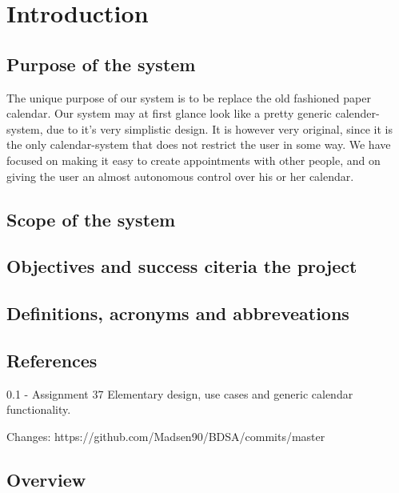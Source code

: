 \section{Introduction}
	\subsection{Purpose of the system}
	The unique purpose of our system is to be replace the old fashioned paper calendar. Our system may at first glance look like a pretty generic calender-system, due to it's very simplistic design. It is however very original, since it is the only calendar-system that does not restrict the user in some way. We have focused on making it easy to create appointments with other people, and on giving the user an almost autonomous control over his or her calendar. 
	\subsection{Scope of the system}

	\subsection{Objectives and success citeria the project}
	
	\subsection{Definitions, acronyms and abbreveations}
	
	\subsection{References}
	
	0.1 - Assignment 37
	Elementary design, use cases and generic calendar functionality.

	Changes:
	https://github.com/Madsen90/BDSA/commits/master
	\subsection{Overview}